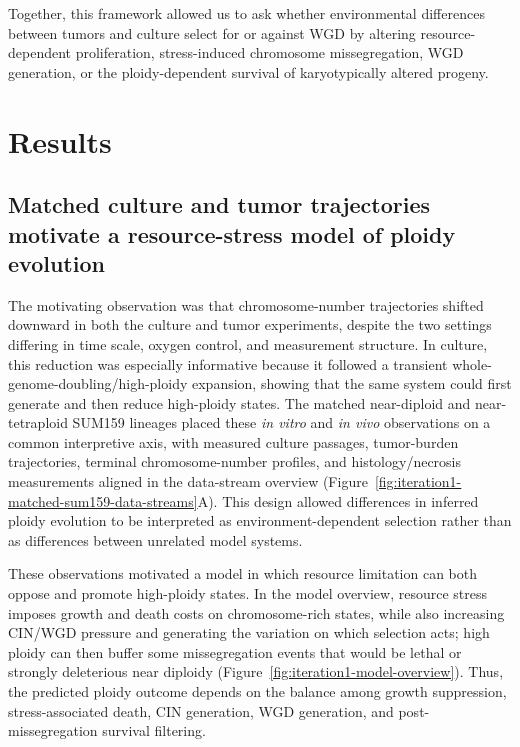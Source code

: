 \documentclass[11pt]{article}
\begin{document}
Together, this framework allowed us to ask whether environmental differences between tumors and culture select for or against WGD by altering resource-dependent proliferation, stress-induced chromosome missegregation, WGD generation, or the ploidy-dependent survival of karyotypically altered progeny.



\section*{Results}



\subsection*{Matched culture and tumor trajectories motivate a resource-stress model of ploidy evolution}

The motivating observation was that chromosome-number trajectories shifted downward in both the culture and tumor experiments, despite the two settings differing in time scale, oxygen control, and measurement structure. In culture, this reduction was especially informative because it followed a transient whole-genome-doubling/high-ploidy expansion, showing that the same system could first generate and then reduce high-ploidy states. The matched near-diploid and near-tetraploid SUM159 lineages placed these \textit{in vitro} and \textit{in vivo} observations on a common interpretive axis, with measured culture passages, tumor-burden trajectories, terminal chromosome-number profiles, and histology/necrosis measurements aligned in the data-stream overview (Figure~\ref{fig:iteration1-matched-sum159-data-streams}A). This design allowed differences in inferred ploidy evolution to be interpreted as environment-dependent selection rather than as differences between unrelated model systems.

These observations motivated a model in which resource limitation can both oppose and promote high-ploidy states. In the model overview, resource stress imposes growth and death costs on chromosome-rich states, while also increasing CIN/WGD pressure and generating the variation on which selection acts; high ploidy can then buffer some missegregation events that would be lethal or strongly deleterious near diploidy (Figure~\ref{fig:iteration1-model-overview}). Thus, the predicted ploidy outcome depends on the balance among growth suppression, stress-associated death, CIN generation, WGD generation, and post-missegregation survival filtering.
\end{document}
